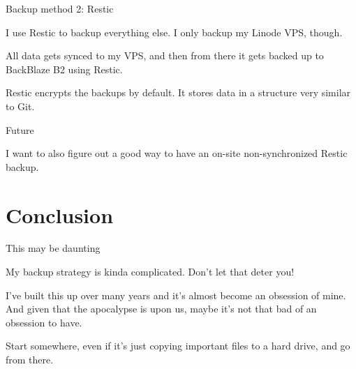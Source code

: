 \documentclass{lug}
\begin{document}
\begin{frame}{Backup method 2: Restic}

    I use Restic to backup everything else. I only backup my Linode VPS, though.

    \pause
    All data gets synced to my VPS, and then from there it gets backed up to
    BackBlaze B2 using Restic.

    \pause
    Restic encrypts the backups by default. It stores data in a structure very
    similar to Git.

\end{frame}

\begin{frame}{Future}

    I want to also figure out a good way to have an on-site non-synchronized
    Restic backup.

\end{frame}

\section{Conclusion}

\begin{frame}{This may be daunting}

    My backup strategy is kinda complicated. Don't let that deter you!

    \pause
    I've built this up over many years and it's almost become an obsession of
    mine. \pause And given that the apocalypse is upon us, maybe it's not that
    bad of an obsession to have.

    \pause
    Start somewhere, even if it's just copying important files to a hard drive,
    and go from there.

\end{frame}
\end{document}
